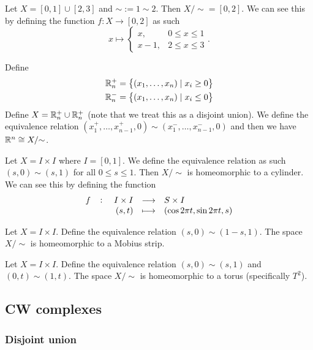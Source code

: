 \documentclass[11pt,a4paper]{article}
\begin{document}
\begin{example}
  Let $X = [0,1] \cup [2,3]$ and $\sim := 1 \sim 2$.
  Then ${X}/{\sim} = [0,2]$.
  We can see this by defining the function $f \colon X \to [0,2]$ as such
  \[
    x \mapsto
    \begin{cases}
      x, & 0 \le x \le 1 \\
      x - 1, & 2 \le x \le 3
    \end{cases}.
  \]
\end{example}

\begin{example}
  Define
  \begin{align*}
    \mathbb{R}_n^+ &= \left\{(x_1,\dots,x_n) \mid x_i \geq 0 \right\} \\
    \mathbb{R}_n^- &= \left\{(x_1,\dots,x_n) \mid x_i \le 0 \right\}
  \end{align*}
  Define $X = \mathbb{R}_n^+ \cup \mathbb{R}_n^+$ (note that we treat this as a disjoint union).
  We define the equivalence relation 
  $(x_1^+,\dots,x_{n-1}^+, 0) \sim (x_1^-,\dots,x_{n-1}^-,0)$
  and then we have $\mathbb{R}^n \cong {X}/{\sim}$.
\end{example}

\begin{example}
  Let $X = I \times I$ where $I = [0,1]$.
  We define the equivalence relation as such $(s,0) \sim (s,1)$ for all
  $0 \le s \le 1$.
  Then ${X}/{\sim}$ is homeomorphic to a cylinder.
  We can see this by defining the function
  \[
    \fullfunction{f}{I \times I}{S \times I}
    {(s,t)}{(\cos 2 \pi t, \sin 2 \pi t, s)}
  \]
\end{example}

\begin{example}
  Let $X = I \times I$.
  Define the equivalence relation $(s, 0) \sim (1 - s, 1)$.
  The space ${X}/{\sim}$ is homeomorphic to a Mobius strip.
\end{example}

\begin{example}
  Let $X = I \times I$.
  Define the equivalence relation $(s, 0) \sim (s, 1)$ and 
  $(0, t) \sim (1, t)$.
  The space ${X}/{\sim}$ is homeomorphic to a torus (specifically
  $T^2$).
\end{example}

\subsection{CW complexes}

\subsubsection{Disjoint union}
\end{document}
